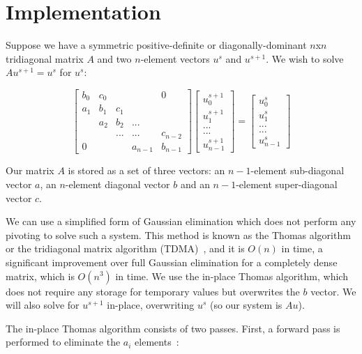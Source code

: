 \documentclass[conference]{IEEEtran}
\begin{document}
\section{Implementation}

Suppose we have a symmetric positive-definite or diagonally-dominant $n$x$n$
tridiagonal matrix $A$ and two $n$-element vectors $u^{s}$ and $u^{s+1}$. We
wish to solve $Au^{s+1} = u^{s}$ for $u^{s}$:

\[
\begin{bmatrix}
b_0 & c_0 &     &         & 0       \\
a_1 & b_1 & c_1 &         &         \\
    & a_2 & b_2 & ...     &         \\
    &     & ... & ...     & c_{n-2} \\
0   &     &     & a_{n-1} & b_{n-1}
\end{bmatrix}
\begin{bmatrix}
u^{s+1}_0     \\
u^{s+1}_1     \\
...     \\
...     \\
u^{s+1}_{n-1}
\end{bmatrix}
=
\begin{bmatrix}
u^{s}_0     \\
u^{s}_1     \\
...     \\
...     \\
u^{s}_{n-1}
\end{bmatrix}
\]

Our matrix $A$ is stored as a set of three vectors: an $n-1$-element
sub-diagonal vector $a$, an $n$-element diagonal vector $b$ and an $n-1$-element
super-diagonal vector $c$.

We can use a simplified form of Gaussian elimination which does not perform any
pivoting to solve such a system. This method is known as the Thomas algorithm
or the tridiagonal matrix algorithm (TDMA)~\cite{TDMA}, and it is \(O(n)\) in time,
a significant improvement over full Gaussian elimination for a completely dense
matrix, which is \(O(n^3)\) in time. We use the in-place Thomas algorithm,
which does not require any storage for temporary values but overwrites the $b$
vector. We will also solve for $u^{s+1}$ in-place, overwriting $u^{s}$ (so our
system is $Au$).

The in-place Thomas algorithm consists of two passes. First, a forward pass is
performed to eliminate the $a_i$ elements~\cite{??}:
\end{document}
